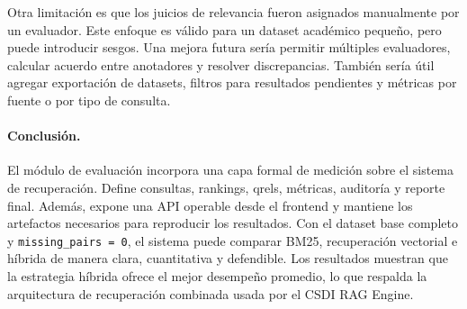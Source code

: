 \documentclass[11pt]{article}
\begin{document}
Otra limitación es que los juicios de relevancia fueron asignados manualmente por un evaluador. Este enfoque es válido para un dataset académico pequeño, pero puede introducir sesgos. Una mejora futura sería permitir múltiples evaluadores, calcular acuerdo entre anotadores y resolver discrepancias. También sería útil agregar exportación de datasets, filtros para resultados pendientes y métricas por fuente o por tipo de consulta.

\paragraph{Conclusión.}
El módulo de evaluación incorpora una capa formal de medición sobre el sistema de recuperación. Define consultas, rankings, qrels, métricas, auditoría y reporte final. Además, expone una API operable desde el frontend y mantiene los artefactos necesarios para reproducir los resultados. Con el dataset base completo y \texttt{missing\_pairs = 0}, el sistema puede comparar BM25, recuperación vectorial e híbrida de manera clara, cuantitativa y defendible. Los resultados muestran que la estrategia híbrida ofrece el mejor desempeño promedio, lo que respalda la arquitectura de recuperación combinada usada por el CSDI RAG Engine.
\end{document}
